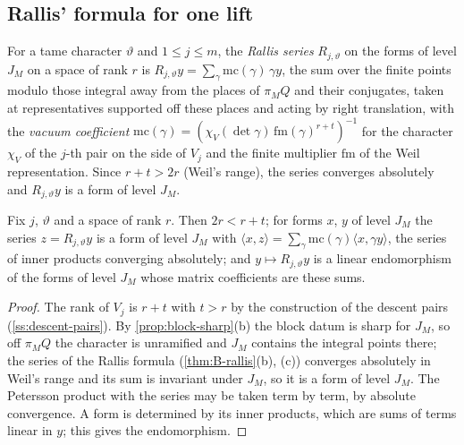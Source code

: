 \subsection{Rallis' formula for one lift}\label{ss:norm-one-lift}
For a tame character $\vartheta$ and $1\le j\le m$, the \emph{Rallis series} $R_{j,\vartheta}$ on the forms of level $J_M$ on a space of rank $r$ is
$R_{j,\vartheta}y=\sum_\gamma\mathrm{mc}(\gamma)\,\gamma y$, the sum over the finite points modulo those integral away from the places of $\pi_MQ$ and their conjugates, taken at representatives
supported off these places and acting by right translation, with the \emph{vacuum coefficient} $\mathrm{mc}(\gamma)=(\chi_V(\det\gamma)\,\mathrm{fm}(\gamma)^{r+t})^{-1}$ for the character $\chi_V$ of the
$j$-th pair on the side of $V_j$ and the finite multiplier $\mathrm{fm}$ of the Weil representation. Since $r+t>2r$ (Weil's range), the series converges absolutely and $R_{j,\vartheta}y$ is a
form of level $J_M$.

\begin{lemma}\label{lem:rallis-series}
Fix $j$, $\vartheta$ and a space of rank $r$. Then $2r<r+t$; for forms $x$, $y$ of level $J_M$ the series $z=R_{j,\vartheta}y$ is a form of level $J_M$ with $\langle x,z\rangle=\sum_\gamma\mathrm{mc}(\gamma)\langle x,\gamma y\rangle$, the
series of inner products converging absolutely; and $y\mapsto R_{j,\vartheta}y$ is a linear endomorphism of the forms of level $J_M$ whose matrix coefficients are these sums.
\end{lemma}

\begin{proof}
The rank of $V_j$ is $r+t$ with $t>r$ by the construction of the descent pairs (\cref{ss:descent-pairs}). By \cref{prop:block-sharp}(b) the block datum is sharp for $J_M$, so off $\pi_MQ$ the character is unramified and $J_M$ contains the integral
points there; the series of the Rallis formula (\cref{thm:B-rallis}(b), (c)) converges absolutely in Weil's range and its sum is invariant under $J_M$, so it is a form of level $J_M$. The Petersson product with the series may be taken term by
term, by absolute convergence. A form is determined by its inner products, which are sums of terms linear in $y$; this gives the endomorphism.
\end{proof}

